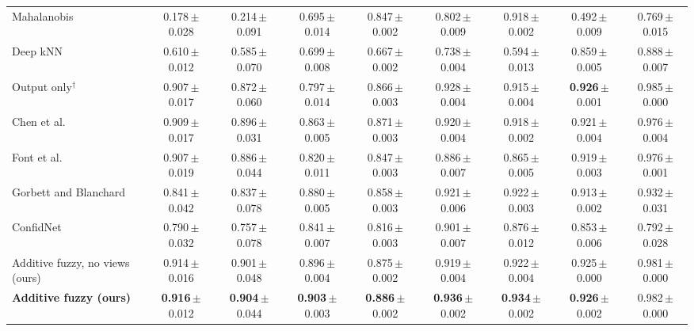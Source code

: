 \begin{table}[t]
{\begin{tabular}{lcccccccc}
  Mahalanobis & 0.178\,{\scriptsize$\pm$0.028} & 0.214\,{\scriptsize$\pm$0.091} & 0.695\,{\scriptsize$\pm$0.014} & 0.847\,{\scriptsize$\pm$0.002} & 0.802\,{\scriptsize$\pm$0.009} & 0.918\,{\scriptsize$\pm$0.002} & 0.492\,{\scriptsize$\pm$0.009} & 0.769\,{\scriptsize$\pm$0.015} \\
  Deep kNN & 0.610\,{\scriptsize$\pm$0.012} & 0.585\,{\scriptsize$\pm$0.070} & 0.699\,{\scriptsize$\pm$0.008} & 0.667\,{\scriptsize$\pm$0.002} & 0.738\,{\scriptsize$\pm$0.004} & 0.594\,{\scriptsize$\pm$0.013} & 0.859\,{\scriptsize$\pm$0.005} & 0.888\,{\scriptsize$\pm$0.007} \\
  \midrule
  Output only$^\dagger$ & 0.907\,{\scriptsize$\pm$0.017} & 0.872\,{\scriptsize$\pm$0.060} & 0.797\,{\scriptsize$\pm$0.014} & 0.866\,{\scriptsize$\pm$0.003} & 0.928\,{\scriptsize$\pm$0.004} & 0.915\,{\scriptsize$\pm$0.004} & \textbf{0.926}\,{\scriptsize$\pm$0.001} & 0.985\,{\scriptsize$\pm$0.000} \\
  Chen et al.~\cite{chen2019} & 0.909\,{\scriptsize$\pm$0.017} & 0.896\,{\scriptsize$\pm$0.031} & 0.863\,{\scriptsize$\pm$0.005} & 0.871\,{\scriptsize$\pm$0.003} & 0.920\,{\scriptsize$\pm$0.004} & 0.918\,{\scriptsize$\pm$0.002} & 0.921\,{\scriptsize$\pm$0.004} & 0.976\,{\scriptsize$\pm$0.004} \\
  Font et al.~\cite{font2025} & 0.907\,{\scriptsize$\pm$0.019} & 0.886\,{\scriptsize$\pm$0.044} & 0.820\,{\scriptsize$\pm$0.011} & 0.847\,{\scriptsize$\pm$0.003} & 0.886\,{\scriptsize$\pm$0.007} & 0.865\,{\scriptsize$\pm$0.005} & 0.919\,{\scriptsize$\pm$0.003} & 0.976\,{\scriptsize$\pm$0.001} \\
  Gorbett and Blanchard~\cite{gorbett2022} & 0.841\,{\scriptsize$\pm$0.042} & 0.837\,{\scriptsize$\pm$0.078} & 0.880\,{\scriptsize$\pm$0.005} & 0.858\,{\scriptsize$\pm$0.003} & 0.921\,{\scriptsize$\pm$0.006} & 0.922\,{\scriptsize$\pm$0.003} & 0.913\,{\scriptsize$\pm$0.002} & 0.932\,{\scriptsize$\pm$0.031} \\
  ConfidNet~\cite{corbiere2019} & 0.790\,{\scriptsize$\pm$0.032} & 0.757\,{\scriptsize$\pm$0.078} & 0.841\,{\scriptsize$\pm$0.007} & 0.816\,{\scriptsize$\pm$0.003} & 0.901\,{\scriptsize$\pm$0.007} & 0.876\,{\scriptsize$\pm$0.012} & 0.853\,{\scriptsize$\pm$0.006} & 0.792\,{\scriptsize$\pm$0.028} \\
  \midrule
  Additive fuzzy, no views (ours) & 0.914\,{\scriptsize$\pm$0.016} & 0.901\,{\scriptsize$\pm$0.048} & 0.896\,{\scriptsize$\pm$0.004} & 0.875\,{\scriptsize$\pm$0.002} & 0.919\,{\scriptsize$\pm$0.004} & 0.922\,{\scriptsize$\pm$0.004} & 0.925\,{\scriptsize$\pm$0.000} & 0.981\,{\scriptsize$\pm$0.000} \\
  \textbf{Additive fuzzy (ours)} & \textbf{0.916}\,{\scriptsize$\pm$0.012} & \textbf{0.904}\,{\scriptsize$\pm$0.044} & \textbf{0.903}\,{\scriptsize$\pm$0.003} & \textbf{0.886}\,{\scriptsize$\pm$0.002} & \textbf{0.936}\,{\scriptsize$\pm$0.002} & \textbf{0.934}\,{\scriptsize$\pm$0.002} & \textbf{0.926}\,{\scriptsize$\pm$0.002} & 0.982\,{\scriptsize$\pm$0.000} \\
  \bottomrule
\end{tabular}}


\end{table}
